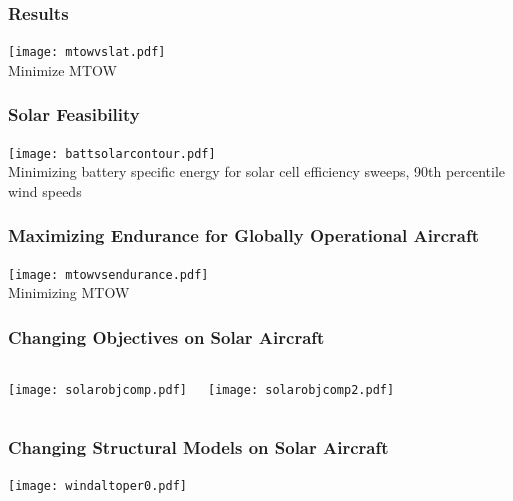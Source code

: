 \documentclass{beamer}
\begin{document}
\begin{frame}
    \frametitle{Results}

    \pause
    \begin{center}
    \texttt{[image: mtowvslat.pdf]} \\
    Minimize MTOW
    \end{center}

\end{frame}

\begin{frame}
    \frametitle{Solar Feasibility}

    \pause
    \begin{center}
    \texttt{[image: battsolarcontour.pdf]} \\
    Minimizing battery specific energy for solar cell efficiency sweeps, 90th percentile wind speeds
    \end{center}

\end{frame}

\begin{frame}
    \frametitle{Maximizing Endurance for Globally Operational Aircraft}

    \pause
    \begin{center}
    \texttt{[image: mtowvsendurance.pdf]} \\
    Minimizing MTOW
    \end{center}

\end{frame}

\begin{frame}
    \frametitle{Changing Objectives on Solar Aircraft}

    \pause
    \begin{columns}
        \texttt{[image: solarobjcomp.pdf]}
        
        \texttt{[image: solarobjcomp2.pdf]}
    \end{columns}

\end{frame}

\begin{frame}
    \frametitle{Changing Structural Models on Solar Aircraft}


    \begin{center}
    \texttt{[image: windaltoper0.pdf]} \\
    \end{center}
    
    \[ \]
\end{frame}
\end{document}
